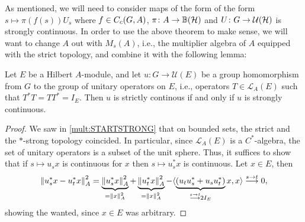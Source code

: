 As mentioned, we will need to consider maps of the form of the form $s \mapsto \pi(f(s)) U_s$ where $f \in C_c(G,A)$, $\pi\colon  A \to \mathbb{B}(\mathcal{H})$ and $U \colon G \to \mathcal{U}(\mathcal{H})$ is strongly continuous. In order to use the above theorem to make sense, we will want to change $A$ out with $M_s(A)$, i.e., the multiplier algebra of $A$ equipped with the strict topology, and combine it with the following lemma:
\begin{lemma}
	Let $E$ be a Hilbert $A$-module, and let $u \colon G \to \mathcal{U}(E)$ be a group homomorphism from $G$ to the group of unitary operators on $E$, i.e., operators $T \in \mathcal{L}_A(E)$ such that $T^*T=TT^*=I_E$. Then $u$ is strictly continous if and only if $u$ is strongly continuous.
	\label{int:unistrictstrong}
\end{lemma}
\begin{proof}
	We saw in \cref{mult:STARTSTRONG} that on bounded sets, the strict and the $*$-strong topology coincided. In particular, since $\mathcal{L}_A(E)$ is a $C^*$-algebra, the set of unitary operators is a subset of the unit sphere. Thus, it suffices to show that if $s \mapsto u_s x$ is continuous for $x$ then $s \mapsto u_s^* x$ is continuous. Let $x \in E$, then
	\begin{align*}
		\left\lVert u_s^* x - u_t^*x \right\rVert_A^2 = \underbrace{\left\lVert u_s^* x \right\rVert_A^2}_{= \left\lVert x \right\rVert_A^2} + \underbrace{\left\lVert u_t^*x \right\rVert_A^2}_{= \left\lVert x \right\rVert_A^2} - \langle \underbrace{ \left( u_t u_s^* + u_s u_t^*  \right)}_{\stackrel{s \to t}{\longrightarrow} 2I_E} x ,x \rangle \stackrel{s \to t}{\longrightarrow} 0,
	\end{align*}
	showing the wanted, since $x \in E$ was arbitrary.
\end{proof}

